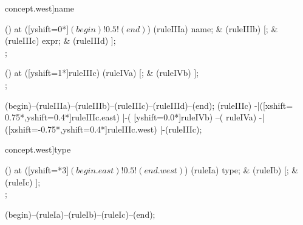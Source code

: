 \begin{syntax}[[xshift=22mm]concept.west]{name}
  
  \node[sequence,column sep=1.5cm] () at ([yshift=0*\syntaxruledist]$(begin)!0.5!(end)$) {
    \node[nonterminal] (ruleIIIa) {name};
    &
    \node[terminal]    (ruleIIIb) {[};
    &
    \node[nonterminal] (ruleIIIc) {expr};
    &
    \node[terminal]    (ruleIIId) {]};
    \\
  };
  
  \node[sequence,column sep=1.0cm] () at ([yshift=1*\syntaxruledist]ruleIIIc) {
    \node[terminal]    (ruleIVa) {[};
    &
    \node[terminal]    (ruleIVb) {]};
    \\
  };
  
  \draw[path] (begin)--(ruleIIIa)--(ruleIIIb)--(ruleIIIc)--(ruleIIId)--(end);
  \draw[path] (ruleIIIc)
            -|([xshift= 0.75*\syntaxruledist,yshift=0.4*\syntaxruledist]ruleIIIc.east)
            |-(                             [yshift=0.0*\syntaxruledist]ruleIVb)
            --(                                                         ruleIVa)
            -|([xshift=-0.75*\syntaxruledist,yshift=0.4*\syntaxruledist]ruleIIIc.west)
            |-(ruleIIIc);
\end{syntax}

\begin{syntax}[[xshift=22mm]concept.west]{type}
  
  \node[sequence,anchor=north,column sep=1.5cm] () at ([yshift=\syntaxrulenodeheight-0.8pt*3]$(begin.east)!0.5!(end.west)$) {
    \node[nonterminal] (ruleIa) {type};
    &
    \node[terminal]    (ruleIb) {[};
    &
    \node[terminal]    (ruleIc) {]};
    \\
  };
  
  \draw[path] (begin)--(ruleIa)--(ruleIb)--(ruleIc)--(end);
\end{syntax}

